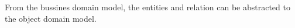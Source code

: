 
From the bussines domain model, the entities and relation can be abstracted to the object domain model.

